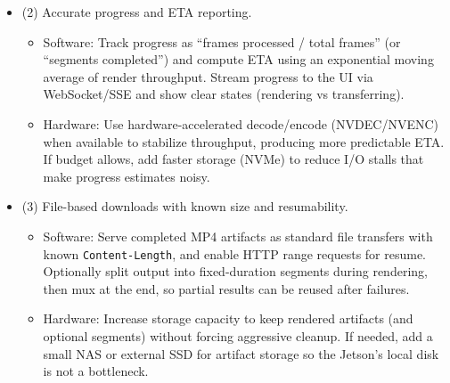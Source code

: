 \documentclass[12pt, titlepage]{article}
\begin{document}
\begin{enumerate}
\begin{itemize}
          \item (2) Accurate progress and ETA reporting.
                \begin{itemize}
                  \item Software: Track progress as ``frames processed / total frames'' (or ``segments
                        completed'') and compute ETA using an exponential moving average of render
                        throughput. Stream progress to the UI via WebSocket/SSE and show clear states
                        (rendering vs transferring).
                  \item Hardware: Use hardware-accelerated decode/encode (NVDEC/NVENC) when available
                        to stabilize throughput, producing more predictable ETA. If budget allows, add
                        faster storage (NVMe) to reduce I/O stalls that make progress estimates noisy.
                \end{itemize}

          \item (3) File-based downloads with known size and resumability.
                \begin{itemize}
                  \item Software: Serve completed MP4 artifacts as standard file transfers with known
                        \texttt{Content-Length}, and enable HTTP range requests for resume. Optionally
                        split output into fixed-duration segments during rendering, then mux at the
                        end, so partial results can be reused after failures.
                  \item Hardware: Increase storage capacity to keep rendered artifacts (and optional
                        segments) without forcing aggressive cleanup. If needed, add a small NAS or
                        external SSD for artifact storage so the Jetson's local disk is not a
                        bottleneck.
                \end{itemize}


\end{itemize}
\end{enumerate}
\end{document}
